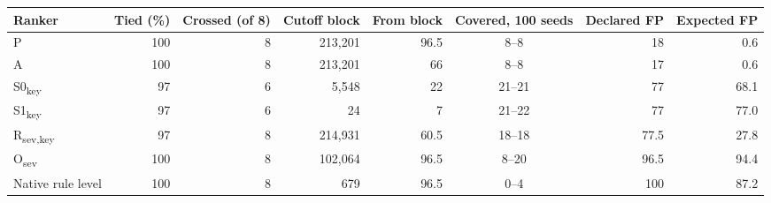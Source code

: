 \begin{tabular}{lrrrrcrr}
\toprule
Ranker & Tied (\%) & Crossed (of 8) & Cutoff block & From block & Covered, 100 seeds & Declared FP & Expected FP \\
\midrule
P & 100 & 8 & 213,201 & 96.5 & 8--8 & 18 & 0.6 \\
A & 100 & 8 & 213,201 & 66 & 8--8 & 17 & 0.6 \\
S0\textsubscript{key} & 97 & 6 & 5,548 & 22 & 21--21 & 77 & 68.1 \\
S1\textsubscript{key} & 97 & 6 & 24 & 7 & 21--22 & 77 & 77.0 \\
R\textsubscript{sev,key} & 97 & 8 & 214,931 & 60.5 & 18--18 & 77.5 & 27.8 \\
O\textsubscript{sev} & 100 & 8 & 102,064 & 96.5 & 8--20 & 96.5 & 94.4 \\
Native rule level & 100 & 8 & 679 & 96.5 & 0--4 & 100 & 87.2 \\
\bottomrule
\end{tabular}
